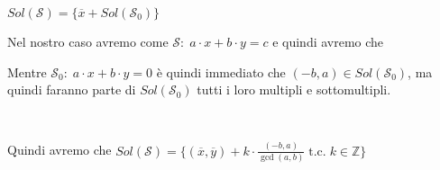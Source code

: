 \begin{boxA}
    {\centering
        $Sol(\mathcal{S}) = \{\overline{x} + Sol(\mathcal{S}_0)\}$
    \par}
    \begin{center}
        \begin{minipage}[t]{0.45\textwidth}
            \centering
            Nel nostro caso avremo come $\mathcal{S}: \; a \cdot x + b \cdot y = c$ e quindi avremo che 
        \end{minipage}
        \begin{minipage}[t]{0.45\textwidth}
            \centering
            Mentre $\mathcal{S}_0: \; a \cdot x + b \cdot y = 0$ è quindi immediato che $(-b, a) \in Sol(\mathcal{S}_0)$, ma quindi faranno parte di $Sol(\mathcal{S}_0)$ tutti i loro multipli e sottomultipli.
        \end{minipage} \\
    \end{center}

    Quindi avremo che $Sol(\mathcal{S}) = \{(\overline{x}, \overline{y}) + k \cdot \frac{(-b, a)}{\gcd (a, b)} \; \text{t.c.} \; k \in \mathbb{Z}\}$
\end{boxA}

